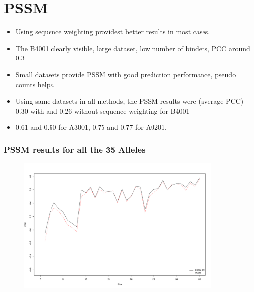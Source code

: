 \documentclass[presentation]{beamer}   %
\begin{document}
\section{PSSM}
\begin{frame}
 \begin{itemize}
\item<1> Using sequence weighting providest better results in most cases.
\item<2> The B4001 clearly visible, large dataset, low number of binders, PCC around 0.3
\item<3> Small datasets provide PSSM with good prediction performance, pseudo counts helps.
\item<4> Using same datasets in all methods, the PSSM results were (average PCC) 0.30 with and 0.26 without sequence weighting for B4001
\item<5> 0.61 and 0.60 for A3001, 0.75 and 0.77 for A0201.
\end{itemize}
\end{frame}

\begin{frame}
\frametitle{PSSM results for all the 35 Alleles}
 \begin{figure}[ht]
  \begin{center}
   \includegraphics[width=10cm]{fig/pssmLN1.pdf}
  \end{center}
 \end{figure}
\end{frame}
\end{document}

